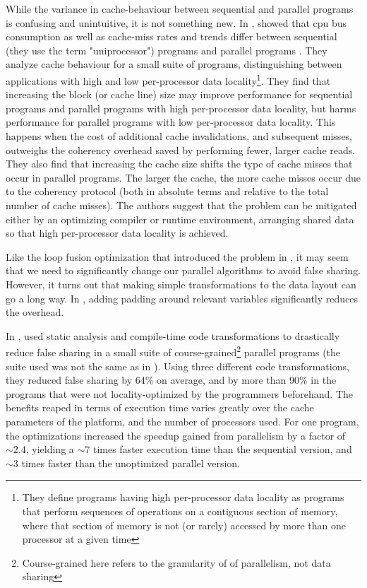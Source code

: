 While the variance in cache-behaviour between sequential and parallel programs
is confusing and unintuitive, it is not something new. In \citeyear{Eggersbus},
\citeauthor{Eggersbus} showed that cpu bus consumption as well as cache-miss
rates and trends differ between sequential (they use the term "uniprocessor")
programs and parallel programs \cite{Eggersbus}.
They analyze cache behaviour for a small suite of programs, distinguishing
between applications with high and low per-processor data locality\footnote{They
define programs having high per-processor data locality as programs that perform
sequences of operations on a contiguous section of memory, where that section of
memory is not (or rarely) accessed by more than one processor at a given time}.
They find that increasing the block (or cache line) size may improve
performance for sequential programs and parallel programs with high
per-processor data locality, but harms performance for parallel programs with
low per-processor data locality. This happens when the cost of additional cache
invalidations, and subsequent misses, outweighs the coherency overhead saved by
performing fewer, larger cache reads. They also find that increasing the cache
size shifts the type of cache misses that occur in parallel programs. The larger
the cache, the more cache misses occur due to the coherency protocol (both in
absolute terms and relative to the total number of cache misses). The authors
suggest that the problem can be mitigated either by an optimizing compiler or
runtime environment, arranging shared data so that high per-processor data
locality is achieved.

Like the loop fusion optimization that introduced the problem in \cite{mystery},
it may seem that we need to significantly change our parallel algorithms to
avoid false sharing. However, it turns out that making simple transformations to
the data layout can go a long way. In \cite{mystery}, adding padding around
relevant variables significantly reduces the overhead.

In \citeyear{EggersReducing}, \citeauthor{EggersReducing} used static analysis
and compile-time code transformations to drastically reduce false sharing in a
small suite of course-grained\footnote{Course-grained here refers to the
granularity of of parallelism, not data sharing} parallel programs
\cite{EggersReducing} (the suite used was not the same as in \cite{Eggersbus}).
Using three different code transformations, they reduced false sharing by 64\%
on average, and by more than 90\% in the programs that were not
locality-optimized by the programmers beforehand. The benefits reaped in terms
of execution time varies greatly over the cache parameters of the platform, and
the number of processors used. For one program, the optimizations increased the
speedup gained from parallelism by a factor of $\sim 2.4$, yielding a $\sim 7$
times faster execution time than the sequential version, and $\sim 3$ times
faster than the unoptimized parallel version.

